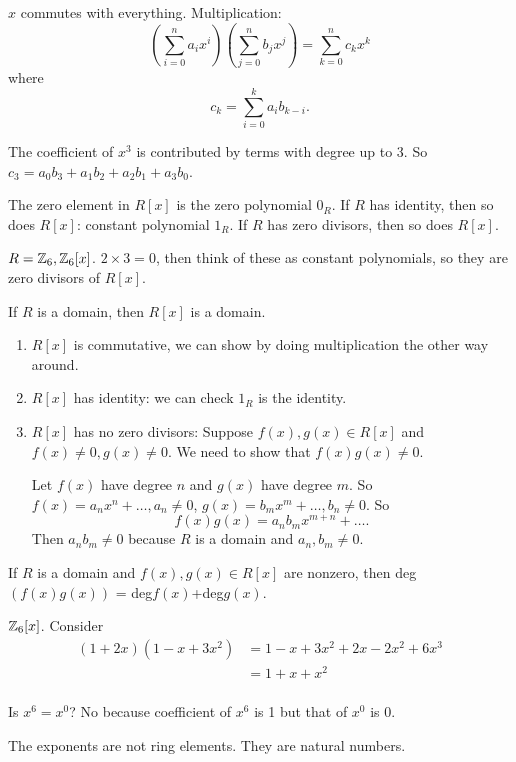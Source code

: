 \documentclass[class=article,crop=false]{standalone}
\begin{document}
$ x$ commutes with everything.
Multiplication:
\[
	\left( \sum_{ i= 0}^{ n} a_i x^{i} \right) \left( \sum_{ j= 0}^{ n} b_j x^{j} \right) = \sum_{ k= 0}^{ n} c_k x^{k} 
\]
where 
\[
c_k = \sum_{ i= 0}^{ k} a_i b_{k-i}
.\] 

\begin{eg}[]
The coefficient of $ x^3$ is contributed by terms with degree up to 3. So $ c_3 = a_0 b_3 + a_1 b_2 + a_2 b_1 + a_3 b_0$.
\end{eg}

\begin{prop}[]
	The zero element in $ R[x]$ is the zero polynomial  $ 0_R$. If  $ R$ has identity, then so does  $ R[x]$: constant polynomial  $ 1_R$. If  $ R$ has zero divisors, then so does  $ R[x]$.
\end{prop}

\begin{eg}[]
	$ R=\mathbb{Z}_6, \mathbb{Z}_6[x]$. $ 2\times 3=0$, then think of these as constant polynomials, so they are zero divisors of $ R[x]$.
\end{eg}

\begin{thm}[]
	If $ R$ is a domain, then  $ R[x]$ is a domain.
\end{thm}
\begin{prf}
\begin{enumerate}[label=(\roman*)]
	\item $ R[x]$ is commutative, we can show by doing multiplication the other way around.
	\item  $ R[x]$ has identity: we can check  $ 1_R$ is the identity.
	\item  $ R[x]$ has no zero divisors: Suppose  $ f(x),g(x) \in R[x]$ and $ f(x) \neq 0, g(x)\neq 0$. We need to show that  $ f(x)g(x)\neq 0$.

		Let  $ f(x)$ have degree  $ n$ and  $ g(x)$ have degree  $ m$. So  $ f(x)=a_n x^{n}+ \ldots, a_n\neq 0$, $ g(x) = b_m x^{m}+ \ldots, b_n \neq 0$. So
		\[
			f(x)g(x)=a_n b_m x^{m+n}+\ldots
		.\] 
		Then $ a_n b_m \neq 0$ because $ R$ is a domain and  $ a_n, b_m \neq 0$.
\end{enumerate}
\end{prf}

\begin{coro}[]
	If $ R$ is a domain and  $ f(x),g(x) \in R[x]$ are nonzero, then deg$(f(x)g(x)) $ = deg$f(x) $+deg$g(x) $.
\end{coro}

\begin{eg}
	$ \mathbb{Z}_6[x]$. Consider
	\begin{align*}
		(1+2x)(1-x+3x^2) &= 1-x+3x^2+2x-2x^2 +6x^3 \\
		&= 1+x+x^2 \\
	\end{align*}

	Is $ x^{6} = x^{0}$? No because coefficient of $ x^{6}$ is 1 but that of $ x^{0}$ is 0. 
	\begin{note}[]
	The exponents are not ring elements. They are natural numbers.
	\end{note}
\end{eg}
\end{document}
